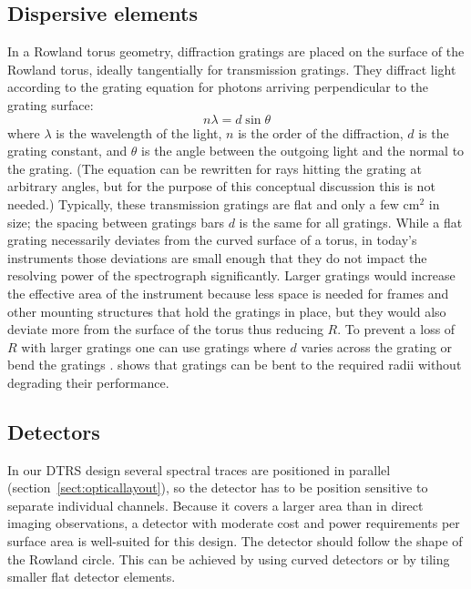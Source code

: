 \documentclass[twocolumn]{aastex631}
\begin{document}
\subsection{Dispersive elements}
In a Rowland torus geometry, diffraction gratings are placed on the surface of the Rowland torus, ideally tangentially for transmission gratings. They diffract light according to the grating equation for photons arriving perpendicular to the grating surface:
\begin{equation}
n \lambda = d \sin \theta \label{eqn:diffraction}
\end{equation}
where $\lambda$ is the wavelength of the light, $n$ is the order of the diffraction, $d$ is the grating constant, and $\theta$ is the angle between the outgoing light and the normal to the grating. (The equation can be rewritten for rays hitting the grating at arbitrary angles, but for the purpose of this conceptual discussion this is not needed.)
Typically, these transmission gratings are flat and only a few cm$^2$ in size; the spacing between gratings bars $d$ is the same for all gratings.
While a flat grating necessarily deviates from the curved surface of a torus, in today's instruments those deviations are small enough that they do not impact the resolving power of the spectrograph significantly. Larger gratings would increase the effective area of the instrument because less space is needed for frames and other mounting structures that hold the gratings in place, but they would also deviate more from the surface of the torus thus reducing $R$.
To prevent a loss of $R$ with larger gratings one can use gratings where $d$ varies across the grating \citep{1986SPIE..560...96H,2020SPIE11444E..88G} or bend the gratings \citep{2020SPIE11444E..88G}. \citet{2019SPIE11118E..11G} shows that gratings can be bent to the required radii without degrading their performance.


\subsection{Detectors}
In our DTRS design several spectral traces are positioned in parallel (section~\ref{sect:opticallayout}), so the detector has to be position sensitive to separate individual channels.  Because it covers a larger area than in direct imaging observations, a detector with moderate cost and power requirements per surface area is well-suited for this design. The detector should follow the shape of the Rowland circle. This can be achieved by using curved detectors or by tiling smaller flat detector elements. %
\end{document}
